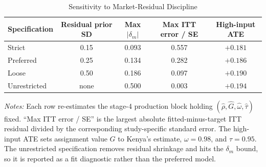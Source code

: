 \begin{table}[H]
\centering
\caption{Sensitivity to Market-Residual Discipline}
\label{tab:struct_resid_sensitivity}
\begin{threeparttable}
\begin{tabular}[t]{lcccc}
\toprule
Specification & Residual prior SD & Max $|\delta_m|$ & Max ITT error / SE & High-input ATE \\
\midrule
Strict & 0.15 & 0.093 & 0.557 & $+0.181$ \\
Preferred & 0.25 & 0.134 & 0.282 & $+0.186$ \\
Loose & 0.50 & 0.186 & 0.097 & $+0.190$ \\
Unrestricted & none & 0.500 & 0.003 & $+0.194$ \\
\bottomrule
\end{tabular}
\begin{tablenotes}
\footnotesize
\item \textit{Notes:} Each row re-estimates the stage-4 production block holding $(\hat{\rho},\hat{G},\hat{\omega},\hat{\tau})$ fixed. ``Max ITT error / SE'' is the largest absolute fitted-minus-target ITT residual divided by the corresponding study-specific standard error. The high-input ATE sets assignment value $G$ to Kenya's estimate, $\omega=0.98$, and $\tau=0.95$. The unrestricted specification removes residual shrinkage and hits the $\delta_m$ bound, so it is reported as a fit diagnostic rather than the preferred model.
\end{tablenotes}
\end{threeparttable}
\end{table}
